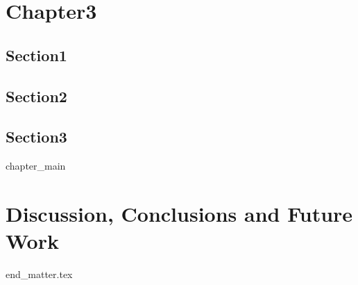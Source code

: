 \documentclass[drafts]{dissertation}
\begin{document}
     \chapter{Chapter3}
     \label{chapter:3}
     \section{Section1}
     \section{Section2}
     \section{Section3}
\fi




\ifchapeight
{chapter_main}
\else
\chapter{Discussion, Conclusions and Future Work}
\label{chapter:conclusions}
\fi

\thumbfalse
\FloatBarrier

{end_matter.tex}
\end{document}
